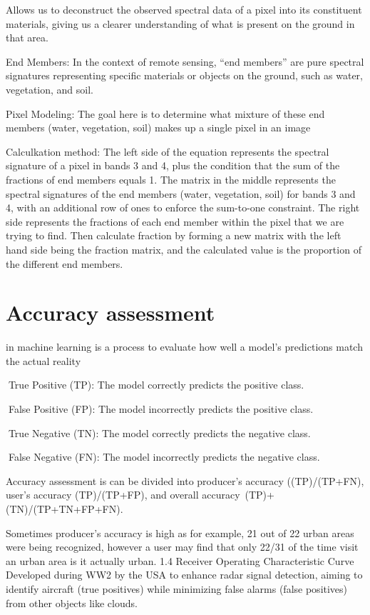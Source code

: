 \documentclass[
  letterpaper,
  DIV=11,
  numbers=noendperiod]{scrreprt}
\begin{document}
Allows us to deconstruct the observed spectral data of a pixel into its
constituent materials, giving us a clearer understanding of what is
present on the ground in that area.

End Members: In the context of remote sensing, ``end members'' are pure
spectral signatures representing specific materials or objects on the
ground, such as water, vegetation, and soil.

Pixel Modeling: The goal here is to determine what mixture of these end
members (water, vegetation, soil) makes up a single pixel in an image

Calculkation method: The left side of the equation represents the
spectral signature of a pixel in bands 3 and 4, plus the condition that
the sum of the fractions of end members equals 1. The matrix in the
middle represents the spectral signatures of the end members (water,
vegetation, soil) for bands 3 and 4, with an additional row of ones to
enforce the sum-to-one constraint. The right side represents the
fractions of each end member within the pixel that we are trying to
find. Then calculate fraction by forming a new matrix with the left hand
side being the fraction matrix, and the calculated value is the
proportion of the different end members.

\section{Accuracy assessment}\label{accuracy-assessment}

in machine learning is a process to evaluate how well a model's
predictions match the actual reality

True Positive (TP): The model correctly predicts the positive class.

False Positive (FP): The model incorrectly predicts the positive class.

True Negative (TN): The model correctly predicts the negative class.

False Negative (FN): The model incorrectly predicts the negative class.

Accuracy assessment is can be divided into producer's accuracy
((TP)/(TP+FN), user's accuracy (TP)/(TP+FP), and overall
accuracy~(TP)+(TN)/(TP+TN+FP+FN).

Sometimes producer's accuracy is high as for example, 21 out of 22 urban
areas were being recognized, however a user may find that only 22/31 of
the time visit an urban area is it actually urban. 1.4 Receiver
Operating Characteristic Curve Developed during WW2 by the USA to
enhance radar signal detection, aiming to identify aircraft (true
positives) while minimizing false alarms (false positives) from other
objects like clouds.
\end{document}
